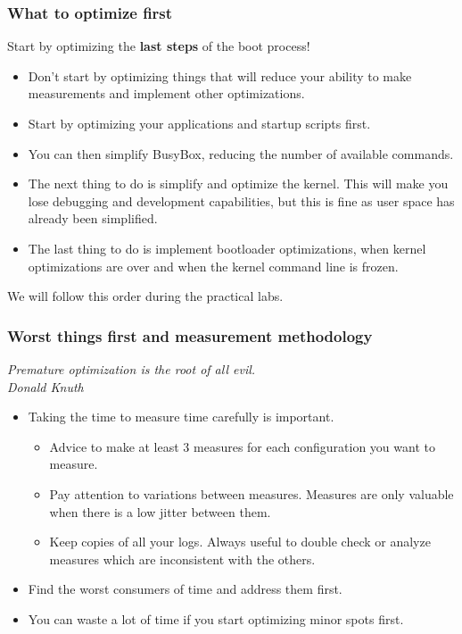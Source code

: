 

\begin{frame}
\frametitle{What to optimize first}
Start by optimizing the {\bf last steps} of the boot process!
\begin{itemize}
\item Don't start by optimizing things that will reduce your ability to
      make measurements and implement other optimizations.
\item Start by optimizing your applications and startup
      scripts first.
\item You can then simplify BusyBox, reducing the number of available
      commands.
\item The next thing to do is simplify and optimize the kernel. This
      will make you lose debugging and development capabilities,
      but this is fine as user space has already been simplified.
\item The last thing to do is implement bootloader optimizations,
      when kernel optimizations are over and when the kernel command
      line is frozen.
\end{itemize}
We will follow this order during the practical labs.
\end{frame}

\begin{frame}
\frametitle{Worst things first and measurement methodology}
{\em Premature optimization is the root of all evil.\\
Donald Knuth}
\begin{itemize}
\item Taking the time to measure time carefully is important.
      \begin{itemize}
           \item Advice to make at least 3 measures for each
                 configuration you want to measure.
           \item Pay attention to variations between measures.
                 Measures are only valuable when there is a low
                 jitter between them.
           \item Keep copies of all your logs. Always useful to
                 double check or analyze measures which are
                 inconsistent with the others.
      \end{itemize}
\item Find the worst consumers of time and address them first.
\item You can waste a lot of time if you start optimizing
      minor spots first.
\end{itemize}
\end{frame}

